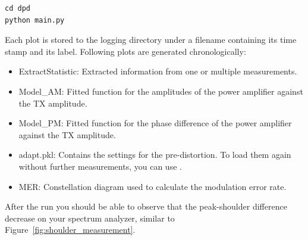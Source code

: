\documentclass[paper=a4, fontsize=11pt]{scrartcl} %
\numberwithin{equation}{section} %
\numberwithin{figure}{section} %
\numberwithin{table}{section} %
\begin{document}
\begin{lstlisting}
cd dpd
python main.py
\end{lstlisting}

Each plot is stored to the logging directory under a filename containing its time stamp and its label. Following plots are generated chronologically:
\begin{itemize}
    \item ExtractStatistic: Extracted information from one or multiple measurements.
    \item Model\_AM: Fitted function for the amplitudes of the power amplifier against the TX amplitude.
    \item Model\_PM: Fitted function for the phase difference of the power amplifier against the TX amplitude.
    \item adapt.pkl: Contains the settings for the pre-distortion. To load them again without further measurements, you can use .
    \item MER: Constellation diagram used to calculate the modulation error rate.
\end{itemize}

After the run you should be able to observe that the peak-shoulder difference decrease on your spectrum analyzer, similar to Figure~\ref{fig:shoulder_measurement}. \\
\end{document}
